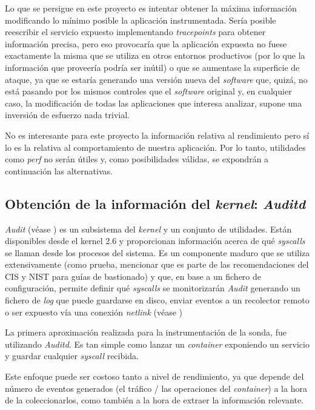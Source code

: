 Lo que se persigue en este proyecto es intentar obtener la máxima información modificando lo mínimo posible la aplicación instrumentada. Sería posible
reescribir el servicio expuesto implementando \emph{tracepoints} para obtener información precisa, pero eso provocaría que la aplicación expuesta no fuese exactamente la misma que se utiliza
en otros entornos productivos (por lo que la información que proveería podría ser inútil) o que se aumentase la superficie de ataque, ya que se estaría
generando una versión nueva del \emph{software} que, quizá, no está pasando por los mismos controles que el \emph{software} original y, en cualquier caso, la modificación de todas las aplicaciones
que interesa analizar, supone una inversión de esfuerzo nada trivial.

No es interesante para este proyecto la información relativa al rendimiento pero sí lo es la relativa al comportamiento de nuestra aplicación. Por lo tanto,
utilidades como \emph{perf} no serán útiles y, como posibilidades válidas, se expondrán a continuación las alternativas.

\subsection{Obtención de la información del \emph{kernel}: \emph{Auditd}}
\label{subsec:auditd}

\emph{Audit} (véase \cite{redhat-auditd}) es un subsistema del \emph{kernel} y un conjunto de utilidades. 
Están disponibles desde el kernel 2.6 y proporcionan información acerca de qué \emph{syscalls}
se llaman desde los procesos del sistema. 
Es un componente maduro que se utiliza extensivamente (como prueba, mencionar que es parte de las recomendaciones del CIS y NIST para guías de bastionado)
y que, en base a un fichero de configuración, permite definir qué \emph{syscalls} se monitorizarán
\emph{Audit} generando un fichero de \emph{log} que puede guardarse en disco, enviar eventos a un recolector remoto o ser expuesto vía una conexión
\emph{netlink} (véase \cite{wiki-netlink})

La primera aproximación realizada para la instrumentación de la sonda, fue utilizando \emph{Auditd}. Es tan simple como lanzar un \emph{container} exponiendo un servicio
y guardar cualquier \emph{syscall} recibida. 

Este enfoque puede ser costoso tanto a nivel de rendimiento, ya que depende del número de eventos generados (el tráfico / las operaciones del \emph{container}) a la hora de la coleccionarlos, como también
a la hora de extraer la información relevante.

